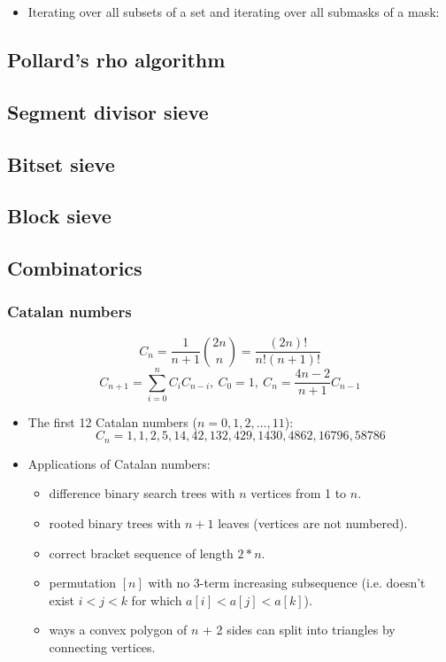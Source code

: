 \begin{itemize}
  \item Iterating over all subsets of a set and iterating over all submasks of a mask:
\end{itemize}

\subsection{Pollard's rho algorithm}

\subsection{Segment divisor sieve}

\subsection{Bitset sieve}

\subsection{Block sieve}

\subsection{Combinatorics}
\subsubsection{Catalan numbers}
\[ C_n = \frac{1}{n + 1} {2n \choose n} = \frac{(2n)!}{n!(n+1)!}\]
\[ C_{n + 1} = \displaystyle\sum_{i = 0}^{n}C_i C_{n - i},\ C_0 = 1,\ C_n = \frac{4n - 2}{n + 1}C_{n - 1}\]
\begin{itemize}
  \item The first 12 Catalan numbers ($n = 0, 1, 2, \ldots, 11$):
  \[ C_n = 1, 1, 2, 5, 14, 42, 132, 429, 1430, 4862, 16796, 58786 \]
  \item Applications of Catalan numbers:
  \begin{itemize}
    \item difference binary search trees with $n$ vertices from 1 to $n$.
    \item rooted binary trees with $n + 1$ leaves (vertices are not numbered).
    \item correct bracket sequence of length $2 * n$.
    \item permutation $[n]$ with no 3-term increasing subsequence (i.e. doesn't exist $i < j < k$ for which $a[i] < a[j] < a[k]$).
    \item ways a convex polygon of $n$ + 2 sides can split into triangles by connecting vertices.
  \end{itemize}
\end{itemize}

